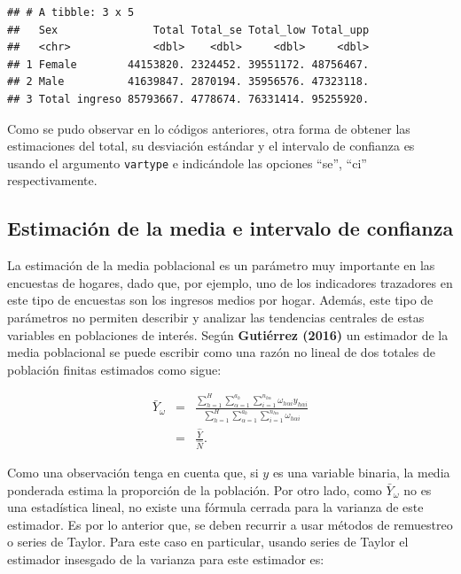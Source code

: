 \documentclass[
  12pt,
]{book}
\begin{document}
\begin{verbatim}
## # A tibble: 3 x 5
##   Sex               Total Total_se Total_low Total_upp
##   <chr>             <dbl>    <dbl>     <dbl>     <dbl>
## 1 Female        44153820. 2324452. 39551172. 48756467.
## 2 Male          41639847. 2870194. 35956576. 47323118.
## 3 Total ingreso 85793667. 4778674. 76331414. 95255920.
\end{verbatim}

Como se pudo observar en lo códigos anteriores, otra forma de obtener las estimaciones del total, su desviación estándar y el intervalo de confianza es usando el argumento \texttt{vartype} e indicándole las opciones ``se'', ``ci'' respectivamente.

\hypertarget{estimaciuxf3n-de-la-media-e-intervalo-de-confianza}{%
\subsection{Estimación de la media e intervalo de confianza}\label{estimaciuxf3n-de-la-media-e-intervalo-de-confianza}}

La estimación de la media poblacional es un parámetro muy importante en las encuestas de hogares, dado que, por ejemplo, uno de los indicadores trazadores en este tipo de encuestas son los ingresos medios por hogar. Además, este tipo de parámetros no permiten describir y analizar las tendencias centrales de estas variables en poblaciones de interés. Según \textbf{Gutiérrez (2016)} un estimador de la media poblacional se puede escribir como una razón no lineal de dos totales de población finitas estimados como sigue:

\begin{eqnarray*}
\bar{Y}_{\omega} & = & \frac{\sum_{h=1}^{H}\sum_{\alpha=1}^{a_{h}}\sum_{i=1}^{n_{h\alpha}}\omega_{h\alpha i}y_{h\alpha i}}{\sum_{h=1}^{H}\sum_{\alpha=1}^{a_{h}}\sum_{i=1}^{n_{h\alpha}}\omega_{h\alpha i}}\\
 & = & \frac{\hat{Y}}{\hat{N}}.
\end{eqnarray*}

Como una observación tenga en cuenta que, si \(y\) es una variable
binaria, la media ponderada estima la proporción de la población.
Por otro lado, como \(\bar{Y}_{\omega}\) no es una estadística lineal,
no existe una fórmula cerrada para la varianza de este estimador.
Es por lo anterior que, se deben recurrir a usar métodos de remuestreo
o series de Taylor. Para este caso en particular, usando series de
Taylor el estimador insesgado de la varianza para este estimador es:
\end{document}
